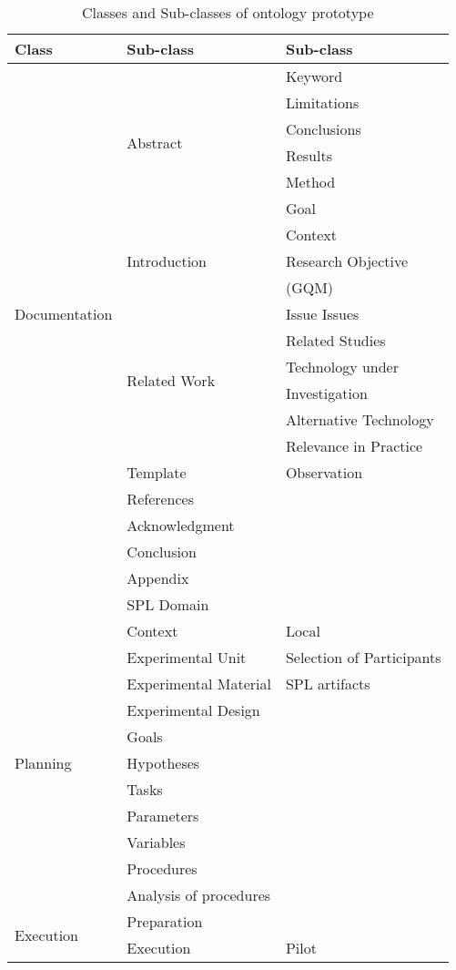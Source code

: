 \begin{table}[]
	\caption{Classes and Sub-classes of ontology prototype}
	\label{tab:class_sub_class_ontology}
	\begin{tabular}{@{}lll@{}}
		\toprule
		Class & Sub-class & Sub-class \\ \midrule
		\multirow{19}{*}{Documentation} & \multirow{6}{*}{Abstract} & Keyword \\
		&  & Limitations \\
		&  & Conclusions \\
		&  & Results \\
		&  & Method \\
		&  & Goal \\
		& \multirow{3}{*}{Introduction} & Context \\
		&  & Research Objective \\ & & (GQM) \\
		&  & Issue Issues \\
		& \multirow{4}{*}{Related Work} & Related Studies \\
		&  & Technology under \\ & & Investigation \\
		&  & Alternative Technology \\
		&  & Relevance in Practice \\
		& Template & Observation \\
		& References &  \\
		& Acknowledgment &  \\
		& Conclusion &  \\
		& Appendix &  \\
		& SPL Domain &  \\
		\multirow{11}{*}{Planning} & Context & Local \\
		& Experimental Unit & Selection of Participants \\
		& Experimental Material & SPL artifacts \\
		& Experimental Design &  \\
		& Goals &  \\
		& Hypotheses &  \\
		& Tasks &  \\
		& Parameters &  \\
		& Variables &  \\
		& Procedures &  \\
		& Analysis of procedures &  \\
		\multirow{3}{*}{Execution} & Preparation &  \\
		& Execution & Pilot \\

\end{tabular}
\end{table}
